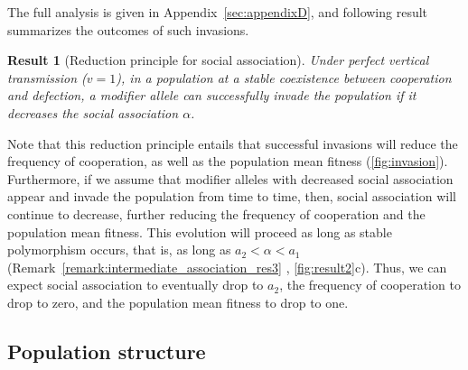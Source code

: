 \documentclass[12pt]{extarticle}
\newtheorem{result}{Result}
\begin{document}
The full analysis is given in Appendix~\ref{sec:appendixD}, and following result summarizes the outcomes of such invasions.
\\

\begin{result}[Reduction principle for social association] 
\label{result:evol_social_association}
Under perfect vertical transmission ($v=1$), in a population at a stable coexistence between cooperation and defection, a modifier allele can successfully invade the population if it decreases the social association $\alpha$.
\end{result}

Note that this reduction principle entails that successful invasions will reduce the frequency of cooperation, as well as the population mean fitness (\autoref{fig:invasion}).
Furthermore, if we assume that modifier alleles with decreased social association appear and invade the population from time to time, then, social association will continue to decrease, further reducing the frequency of cooperation and the population mean fitness. This evolution will proceed as long as stable polymorphism occurs, that is, as long as $a_2 < \alpha < a_1$ (Remark~\ref{remark:intermediate_association_res3}
, \autoref{fig:result2}c). 
Thus, we can expect social association to eventually drop to $a_2$, the frequency of cooperation to drop to zero, and the population mean fitness to drop to one.
\\


\subsection*{Population structure}
\end{document}
